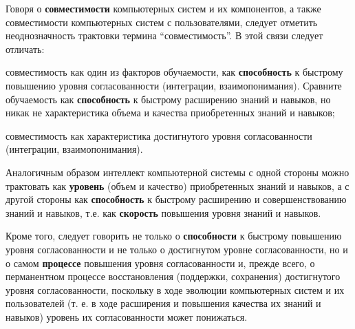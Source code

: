 \begin{SCn}
{Говоря о \textbf{совместимости} компьютерных систем и их компонентов, а также совместимости компьютерных систем с пользователями, следует отметить неоднозначность трактовки термина ``совместимость''. В этой связи следует отличать:

\begin{scnitemize}
    \item совместимость как один из факторов обучаемости, как \textbf{способность} к быстрому повышению уровня согласованности (интеграции, взаимопонимания).
    Сравните обучаемость как \textbf{способность} к быстрому расширению знаний и навыков, но никак не характеристика объема и качества приобретенных знаний и навыков;
    \item совместимость как характеристика достигнутого уровня согласованности (интеграции, взаимопонимания).
\end{scnitemize}

Аналогичным образом интеллект компьютерной системы с одной стороны можно трактовать как \textbf{уровень} (объем и качество) приобретенных знаний и навыков, а с другой стороны как \textbf{способность} к быстрому расширению и совершенствованию знаний и навыков, т.е. как \textbf{скорость} повышения уровня знаний и навыков.

Кроме того, следует говорить не только о \textbf{способности} к быстрому повышению уровня согласованности и не только о достигнутом уровне согласованности, но и о самом \textbf{процессе} повышения уровня согласованности и, прежде всего, о перманентном процессе восстановления (поддержки, сохранения) достигнутого уровня согласованности, поскольку в ходе эволюции компьютерных систем и их пользователей (т. е. в ходе расширения и повышения качества их знаний и навыков) уровень их согласованности может понижаться.\\}

\scnendstruct

\end{SCn}